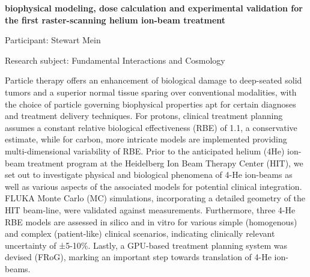\hfill 

\begin{minipage}[t]{1.0\textwidth}

\begin{center}

{{\large\bfseries biophysical modeling, dose calculation and experimental validation for the first raster-scanning helium ion-beam treatment}\par}

\end{center}

{\noindent Participant: Stewart Mein\par} 

{\noindent Research subject: Fundamental Interactions and Cosmology\par}\medskip

\noindent Particle therapy offers an enhancement of biological damage to deep-seated solid tumors and a superior normal tissue sparing over conventional modalities, with the choice of particle governing biophysical properties apt for certain diagnoses and treatment delivery techniques. For protons, clinical treatment planning assumes a constant relative biological effectiveness (RBE) of 1.1, a conservative estimate, while for carbon, more intricate models are implemented providing multi-dimensional variability of RBE. Prior to the anticipated helium (4He) ion-beam treatment program at the Heidelberg Ion Beam Therapy Center (HIT), we set out to investigate physical and biological phenomena of 4-He ion-beams as well as various aspects of the associated models for potential clinical integration. FLUKA Monte Carlo (MC) simulations, incorporating a detailed geometry of the HIT beam-line, were validated against measurements. Furthermore, three 4-He RBE models are assessed in silico and in vitro for various simple (homogenous) and complex (patient-like) clinical scenarios, indicating clinically relevant uncertainty of ±5-10\%. Lastly, a GPU-based treatment planning system was devised (FRoG), marking an important step towards translation of 4-He ion-beams.\par\end{minipage}

\hfill 

